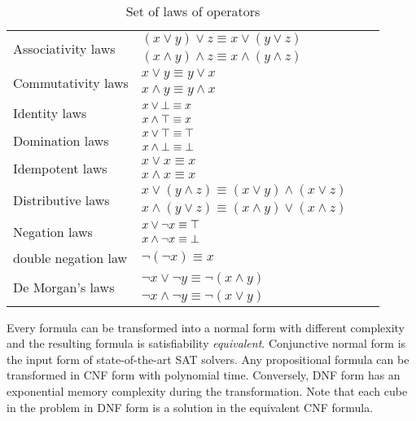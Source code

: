 \begin{table}[!htbp]
 \centering
 \begin{tabular}{lllc}
  \multirow{2}{*}{Associativity laws} & $(x \lor y) \lor z \equiv x \lor (y \lor z)$\\
          & $(x \land y) \land z \equiv x \land (y \land z)$\\
  \hline              
  \multirow{2}{*}{Commutativity laws} & $x \lor y \equiv y \lor x$\\
          & $x \land y \equiv y \land x$\\
  \hline      
  \multirow{2}{*}{Identity laws} & $x \lor \bot \equiv x$\\
           & $x \land \top \equiv x$\\
  \hline        
  \multirow{2}{*}{Domination laws} & $x \lor \top \equiv \top$\\
           &  $x \land \bot \equiv \bot$\\
  \hline        
  \multirow{2}{*}{Idempotent laws} & $x \lor x \equiv x$\\
               & $x \land x \equiv x$\\     
  \hline        
  \multirow{2}{*}{Distributive laws} & $x \lor (y \land z) \equiv (x \lor y) \land (x \lor z)$\\
           & $x \land (y \lor z) \equiv (x \land y) \lor (x \land z)$\\
 \hline        
 \multirow{2}{*}{Negation laws}  & $x \lor \neg x \equiv \top$\\
        & $x \land \neg x \equiv \bot$\\
  \hline
   double negation law & $\neg (\neg x) \equiv x$ \\
  \hline
  \multirow{2}{*}{De Morgan’s laws} & $\neg x \lor \neg y \equiv \neg (x \land y)$\\
            &  $\neg x \land \neg y \equiv \neg (x \lor y)$\\
 \end{tabular}
 \caption{Set of laws of operators}
 \label{tab:laws}
\end{table}
Every formula can be transformed into a normal form with different complexity and the resulting formula is 
satisfiability \emph{equivalent}.
Conjunctive normal form is the input form of state-of-the-art SAT solvers. Any propositional
formula can be transformed in CNF form with polynomial time\cite{Russell1994ArtiCI}. Conversely, DNF form has
an exponential memory complexity during the transformation\cite{darwiche2002knowledge}.
Note that each cube in the problem in DNF form is a solution in the equivalent CNF formula.
